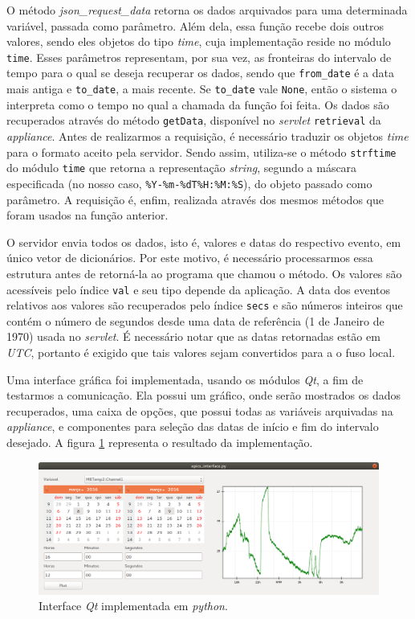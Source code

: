 \vspace{12pt}

O método \textit{json\_request\_data} retorna os dados arquivados para uma
determinada variável, passada como parâmetro. Além dela, essa função recebe dois
outros valores, sendo eles objetos do tipo \textit{time}, cuja implementação
reside no módulo \texttt{time}. Esses parâmetros representam, por sua vez, as
fronteiras do intervalo de tempo para o qual se deseja recuperar os dados, sendo
que \texttt{from\_date} é a data mais antiga e \texttt{to\_date}, a mais
recente. Se \texttt{to\_date} vale \texttt{None}, então o sistema o interpreta
como o tempo no qual a chamada da função foi feita. Os dados são recuperados
através do método \texttt{getData}, disponível no \textit{servlet}
\texttt{retrieval} da \textit{appliance}. Antes de realizarmos a requisição, é
necessário traduzir os objetos \textit{time} para o formato aceito pela
servidor. Sendo assim, utiliza-se o método \texttt{strftime} do módulo
\texttt{time} que retorna a representação \textit{string}, segundo a máscara
especificada (no nosso caso, \texttt{\%Y-\%m-\%dT\%H:\%M:\%S}), do objeto
passado como parâmetro. A requisição é, enfim, realizada através dos mesmos
métodos que foram usados na função anterior.

\vspace{12pt}

O servidor envia todos os dados, isto é, valores e datas do respectivo evento,
em único vetor de dicionários. Por este motivo, é necessário processarmos essa
estrutura antes de retorná-la ao programa que chamou o método. Os valores são
acessíveis pelo índice \texttt{val} e seu tipo depende da aplicação. A data dos
eventos relativos aos valores são recuperados pelo índice \texttt{secs} e são
números inteiros que contém o número de segundos desde uma data de referência
(1 de Janeiro de 1970) usada no \textit{servlet}. É necessário notar que as
datas retornadas estão em \textit{UTC}, portanto é exigido que tais
valores sejam convertidos para a o fuso local.

\vspace{12pt}

Uma interface gráfica foi implementada, usando os módulos \textit{Qt}, a fim de
testarmos a comunicação. Ela possui um gráfico, onde serão mostrados os dados
recuperados, uma caixa de opções, que possui todas as variáveis arquivadas na
\textit{appliance}, e componentes para seleção das datas de início e fim do
intervalo desejado. A figura \ref{fig:interface} representa o resultado da
implementação.

\FloatBarrier

\begin{figure}[h]
    
    \centering
    \includegraphics[scale=0.38]{image/screenshot-python}
    \caption {Interface \textit{Qt} implementada em \textit{python}.}
    \label{fig:interface} 
\end{figure} 

\FloatBarrier

